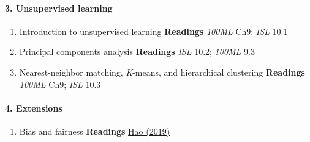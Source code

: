 \documentclass[10pt]{article}
\begin{document}
\paragraph{3. Unsupervised learning}
\begin{enumerate}
  \item Introduction to unsupervised learning \textbf{Readings} \textit{100ML} Ch9; \textit{ISL} 10.1
  \item Principal components analysis \textbf{Readings} \textit{ISL} 10.2; \textit{100ML} 9.3
  \item Nearest-neighbor matching, \textit{K}-means, and hierarchical clustering \textbf{Readings} \textit{100ML} Ch9; \textit{ISL} 10.3
\end{enumerate}

\paragraph{4. Extensions}
\begin{enumerate}
  \item Bias and fairness \textbf{Readings} \href{https://www.technologyreview.com/s/612876/this-is-how-ai-bias-really-happensand-why-its-so-hard-to-fix/}{Hao (2019)}
\end{enumerate}
\end{document}
